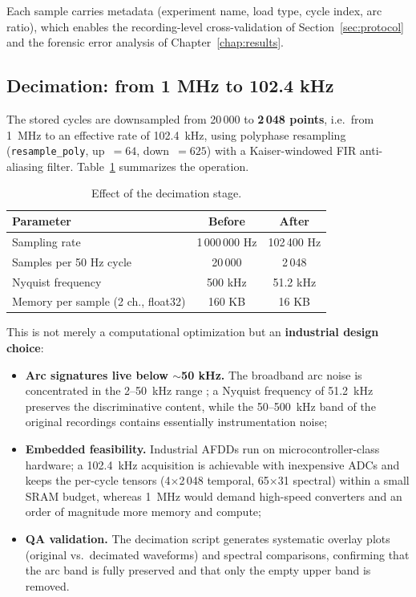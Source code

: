 Each sample carries metadata (experiment name, load type, cycle index, arc ratio), which enables the recording-level cross-validation of Section~\ref{sec:protocol} and the forensic error analysis of Chapter~\ref{chap:results}.

\subsection{Decimation: from 1 MHz to 102.4 kHz}
\label{sec:decimation}

The stored cycles are downsampled from 20\,000 to \textbf{2\,048 points}, i.e.\ from 1~MHz to an effective rate of 102.4~kHz, using polyphase resampling (\texttt{resample\_poly}, up~$=64$, down~$=625$) with a Kaiser-windowed FIR anti-aliasing filter. Table~\ref{tab:decimation} summarizes the operation.

\begin{table}[H]
\centering
\caption{Effect of the decimation stage.}
\label{tab:decimation}
\renewcommand{\arraystretch}{1.3}
\begin{tabular}{|l|c|c|}
\hline
\textbf{Parameter} & \textbf{Before} & \textbf{After} \\
\hline
Sampling rate & 1\,000\,000 Hz & 102\,400 Hz \\
\hline
Samples per 50 Hz cycle & 20\,000 & 2\,048 \\
\hline
Nyquist frequency & 500 kHz & 51.2 kHz \\
\hline
Memory per sample (2 ch., float32) & 160 KB & 16 KB \\
\hline
\end{tabular}
\end{table}

This is not merely a computational optimization but an \textbf{industrial design choice}:

\begin{itemize}[itemsep=2pt]
    \item \textbf{Arc signatures live below $\sim$50 kHz.} The broadband arc noise is concentrated in the 2--50~kHz range \cite{dowalla2023,ning2024interp}; a Nyquist frequency of 51.2~kHz preserves the discriminative content, while the 50--500~kHz band of the original recordings contains essentially instrumentation noise;
    \item \textbf{Embedded feasibility.} Industrial AFDDs run on microcontroller-class hardware; a 102.4~kHz acquisition is achievable with inexpensive ADCs and keeps the per-cycle tensors (4$\times$2\,048 temporal, 65$\times$31 spectral) within a small SRAM budget, whereas 1~MHz would demand high-speed converters and an order of magnitude more memory and compute;
    \item \textbf{QA validation.} The decimation script generates systematic overlay plots (original vs.\ decimated waveforms) and spectral comparisons, confirming that the arc band is fully preserved and that only the empty upper band is removed.
\end{itemize}

